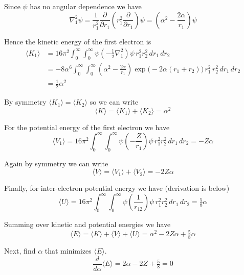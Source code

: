 \documentclass[12pt]{article}
\begin{document}
Since $\psi$ has no angular dependence we have
\begin{equation*}
\nabla^2_1\psi=\frac{1}{r_1^2}\frac{\partial}{\partial r_1}
\left(r_1^2\frac{\partial}{\partial r_1}\right)\psi
=\left(\alpha^2-\frac{2\alpha}{r_1}\right)\psi
\end{equation*}

Hence the kinetic energy of the first electron is
\begin{align*}
\langle K_1\rangle
&=
16\pi^2\int_0^\infty\int_0^\infty\psi\left(-\frac{1}{2}\nabla_1^2\right)\psi
\,r_1^2r_2^2
\,dr_1\,dr_2
\\
&=-8\alpha^6\int_0^\infty\int_0^\infty
\left(\alpha^2-\frac{2\alpha}{r_1}\right)\exp\bigl(-2\alpha(r_1+r_2)\bigr)
\,r_1^2\,r_2^2
\,dr_1\,dr_2
\\
&=\tfrac{1}{2}\alpha^2
\tag{2}
\end{align*}

By symmetry $\langle K_1\rangle=\langle K_2\rangle$ so we can write
\begin{equation*}
\langle K\rangle=\langle K_1\rangle+\langle K_2\rangle=\alpha^2
\end{equation*}

For the potential energy of the first electron we have
\begin{equation*}
\langle V_1\rangle
=
16\pi^2\int_0^\infty\int_0^\infty\psi\left(-\frac{Z}{r_1}\right)\psi
\,r_1^2r_2^2
\,dr_1\,dr_2
=-Z\alpha
\tag{3}
\end{equation*}

Again by symmetry we can write
\begin{equation*}
\langle V\rangle=\langle V_1\rangle+\langle V_2\rangle=-2Z\alpha
\end{equation*}

Finally, for inter-electron potential energy we have (derivation is below)
\begin{equation*}
\langle U\rangle
=
16\pi^2\int_0^\infty\int_0^\infty\psi\left(\frac{1}{r_{12}}\right)\psi
\,r_1^2r_2^2
\,dr_1\,dr_2
=\tfrac{5}{8}\alpha
\tag{4}
\end{equation*}

Summing over kinetic and potential energies we have
\begin{equation*}
\langle E\rangle=\langle K\rangle+\langle V\rangle+\langle U\rangle=\alpha^2-2Z\alpha+\tfrac{5}{8}\alpha
\end{equation*}

Next, find $\alpha$ that minimizes $\langle E\rangle$.
\begin{equation*}
\frac{d}{d\alpha}\langle E\rangle=2\alpha-2Z+\tfrac{5}{8}=0
\end{equation*}
\end{document}
